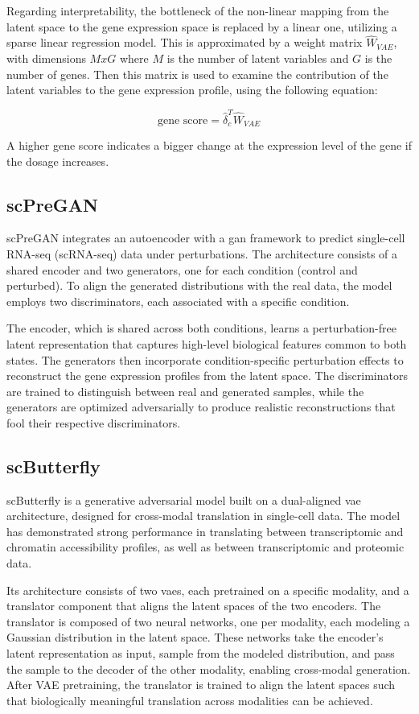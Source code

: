 \documentclass[12pt, a4paper]{article}
\begin{document}
Regarding interpretability, the bottleneck of the non-linear mapping from the latent space to the gene expression space is replaced by a linear one, utilizing a sparse linear regression model. This is approximated by a weight matrix $\hat{W}_{VAE}$, with dimensions $MxG$ where $M$ is the number of latent variables and $G$ is the number of genes. Then this matrix is used to examine the contribution of the latent variables to the gene expression profile, using the following equation:

\[\text{gene score} = \hat{\delta}_c^T \hat{W}_{VAE}\]

A higher gene score indicates a bigger change at the expression level of the gene if the dosage increases.

\subsection{scPreGAN}

scPreGAN integrates an autoencoder with a \gls{gan} framework to predict single-cell RNA-seq (scRNA-seq) data under perturbations. The architecture consists of a shared encoder and two generators, one for each condition (control and perturbed). To align the generated distributions with the real data, the model employs two discriminators, each associated with a specific condition.

The encoder, which is shared across both conditions, learns a perturbation-free latent representation that captures high-level biological features common to both states. The generators then incorporate condition-specific perturbation effects to reconstruct the gene expression profiles from the latent space. The discriminators are trained to distinguish between real and generated samples, while the generators are optimized adversarially to produce realistic reconstructions that fool their respective discriminators.


\subsection{scButterfly}


scButterfly is a generative adversarial model built on a dual-aligned \gls{vae} architecture, designed for cross-modal translation in single-cell data. The model has demonstrated strong performance in translating between transcriptomic and chromatin accessibility profiles, as well as between transcriptomic and proteomic data.

Its architecture consists of two \gls{vae}s, each pretrained on a specific modality, and a translator component that aligns the latent spaces of the two encoders. The translator is composed of two neural networks, one per modality, each modeling a Gaussian distribution in the latent space. These networks take the encoder's latent representation as input, sample from the modeled distribution, and pass the sample to the decoder of the other modality, enabling cross-modal generation.
After VAE pretraining, the translator is trained to align the latent spaces such that biologically meaningful translation across modalities can be achieved.
\end{document}
